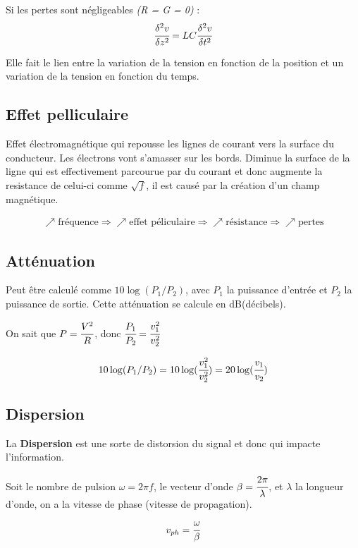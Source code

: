 		Si les pertes sont négligeables \textit{(R = G = 0)} :
		\begin{equation}
			\cfrac{\delta^2 v}{\delta z^2} = LC\cfrac{\delta^2 v}{\delta t^2}
		\end{equation}
		
		Elle fait le lien entre la variation de la tension en fonction de la position et un variation de la tension en fonction du temps.
		
		
	\subsection{Effet pelliculaire}
		Effet électromagnétique qui repousse les lignes de courant  vers la surface du conducteur. Les électrons vont s'amasser sur les bords.
		Diminue la surface de la ligne qui est effectivement parcourue par du courant et donc augmente la resistance de celui-ci comme $\sqrt{f}$, il est causé par la création d'un champ magnétique.
		
		\begin{align*}
			\nearrow \text{fréquence} \Rightarrow \nearrow \text{effet péliculaire} \Rightarrow \nearrow \text{résistance} \Rightarrow \nearrow \text{pertes}
		\end{align*}
			
	\subsection{Atténuation}
		Peut être calculé comme $10\log(P_{1}/P_{2})$, avec $P_1$ la puissance d'entrée et $P_2$ la puissance de sortie. Cette atténuation se calcule en dB(décibels).
		
		On sait que $P = \cfrac{V^2}{R}$, donc $\cfrac{P_1}{P_2} = \cfrac{v_{1}^{2}}{v_{2}^{2}}$
		
		\begin{equation}
			10\log(P_{1}/P_{2}) = 10\log(\cfrac{v_{1}^{2}}{v_{2}^{2}}) = 20\log(\cfrac{v_{1}}{v_{2}})
		\end{equation}
		
	\subsection{Dispersion}
		La \textbf{Dispersion} est une sorte de distorsion du signal et donc qui impacte l'information.
		
		Soit le nombre de pulsion $\omega = 2 \pi f$, le vecteur d'onde $\beta = \cfrac{2\pi}{\lambda}$, et $\lambda$ la longueur d'onde, on a la vitesse de phase (vitesse de propagation).
		\begin{equation}
			v_{ph} = \cfrac{\omega}{\beta}
		\end{equation}
		

